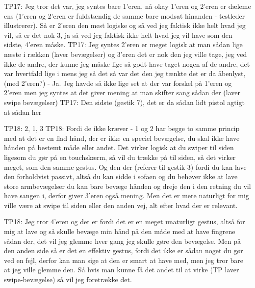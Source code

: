 TP17: Jeg tror det var, jeg syntes bare 1’eren, nå okay 1’eren og 2’eren er dæleme ens (1’eren og 2’eren er fuldstændig de samme bare modsat hinanden - testleder illustrerer). Så er 2’eren den mest logiske og så ved jeg faktisk ikke helt hvad jeg vil, så er det nok 3, ja så ved jeg faktisk ikke helt hvad jeg vil have som den sidste, 4’eren måske.
TP17: Jeg syntes 2’eren er meget logisk at man sådan lige næste i rækken (laver bevægelser) og 3’eren det er nok den jeg ville tage, jeg ved ikke de andre, der kunne jeg måske lige så godt have taget nogen af de andre, det var hvertfald lige i mens jeg så det så var det den jeg tænkte det er da åbenlyst, (med 2’eren?) - Ja. Jeg havde så ikke lige set at der var forskel på 1’eren og 2’eren men jeg syntes at det giver mening at man skifter sang sådan der (laver swipe bevægelser) 
TP17: Den sidste (gestik 7), det er da sådan lidt pistol agtigt at sådan her 

  
TP18: 2, 1, 3
TP18: Fordi de ikke kræver - 1 og 2 har begge to samme princip med at det er en flad hånd, der er ikke en speciel bevægelse, du skal ikke have hånden på bestemt måde eller andet. Det virker logisk at du swiper til siden ligesom du gør på en touchskærm, så vil du trække på til siden, så det virker meget, som den samme gestus. Og den der (referer til gestik 3) fordi du kan lave den forholdvist passivt, altså du kan sidde i sofaen og du behøver ikke at lave store armbevægelser du kan bare bevæge hånden og dreje den i den retning du vil have sangen i, derfor giver 3’eren også mening. Men det er mere naturligt for mig ville være at swipe til siden eller den anden vej, alt efter hvad der er relevant.
   
TP18: Jeg tror 4’eren og det er fordi det er en meget unaturligt gestus, altså for mig at lave og så skulle bevæge min hånd på den måde med at have fingrene sådan der, det vil jeg glemme hver gang jeg skulle gøre den bevægelse. Men på den anden side så er det en effektiv gestus, fordi det ikke er sådan noget du gør ved en fejl, derfor kan man sige at den er smart at have med, men jeg tror bare at jeg ville glemme den. Så hvis man kunne få det andet til at virke (TP laver swipe-bevægelse) så vil jeg foretrække det. 










